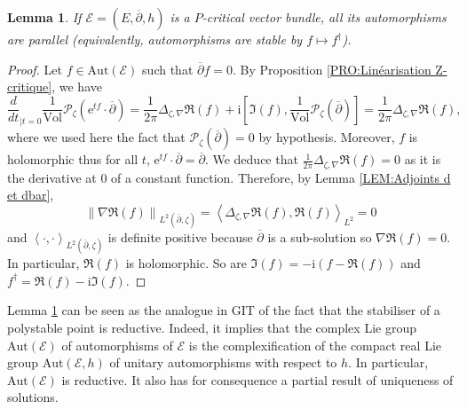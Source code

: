 \documentclass{article}
\newtheorem{lemma}[theorem]{Lemma}
\theoremstyle{remark}
\theoremstyle{definition}
\newcommand{\Aut}{\mathrm{Aut}}
\newcommand{\Vol}{\mathrm{Vol}}
\renewcommand{\i}{\boldsymbol{\mathrm{i}}}
\newcommand{\e}{\boldsymbol{\mathrm{e}}}
\newcommand{\scal}[2]{\left< #1,#2 \right>}
\newcommand{\norme}[1]{\left\| #1 \right\|}
\newcommand{\E}{\mathcal{E}}
\newcommand{\mP}{\mathcal{P}}
\newcommand{\dbar}{\overline{\partial}}
\begin{document}
\begin{lemma}\label{LEM:Aut réductif}
    If $\E = (E,\dbar,h)$ is a $P$-critical vector bundle, all its automorphisms are parallel (equivalently, automorphisms are stable by $f \mapsto f^\dagger$).
\end{lemma}
\begin{proof}
Let $f \in \Aut(\E)$ such that $\dbar f = 0$. By Proposition \ref{PRO:Linéarisation Z-critique}, we have
$$
\frac{d}{dt}_{|t = 0} \frac{1}{\Vol}\mP_\zeta(\e^{tf} \cdot \dbar) = \frac{1}{2\pi}\Delta_{\zeta,\nabla}\Re(f) + \i\left[\Im(f),\frac{1}{\Vol}\mP_\zeta(\dbar)\right] = \frac{1}{2\pi}\Delta_{\zeta,\nabla}\Re(f),
$$
where we used here the fact that $\mP_\zeta(\dbar) = 0$ by hypothesis. Moreover, $f$ is holomorphic thus for all $t$, $\e^{tf} \cdot \dbar = \dbar$. We deduce that $\frac{1}{2\pi}\Delta_{\zeta,\nabla}\Re(f) = 0$ as it is the derivative at $0$ of a constant function. Therefore, by Lemma \ref{LEM:Adjoints d et dbar},
$$
\norme{\nabla\Re(f)}_{L^2(\dbar,\zeta)} = \scal{\Delta_{\zeta,\nabla}\Re(f)}{\Re(f)}_{L^2} = 0
$$
and $\scal{\cdot}{\cdot}_{L^2(\dbar,\zeta)}$ is definite positive because $\dbar$ is a sub-solution so $\nabla\Re(f) = 0$. In particular, $\Re(f)$ is holomorphic. So are $\Im(f) = -\i(f - \Re(f))$ and $f^\dagger = \Re(f) - \i\Im(f)$.
\end{proof}

Lemma \ref{LEM:Aut réductif} can be seen as the analogue in GIT of the fact that the stabiliser of a polystable point is reductive. Indeed, it implies that the complex Lie group $\Aut(\E)$ of automorphisms of $\E$ is the complexification of the compact real Lie group $\Aut(\E,h)$ of unitary automorphisms with respect to $h$. In particular, $\Aut(\E)$ is reductive. It also has for consequence a partial result of uniqueness of solutions.
\end{document}

